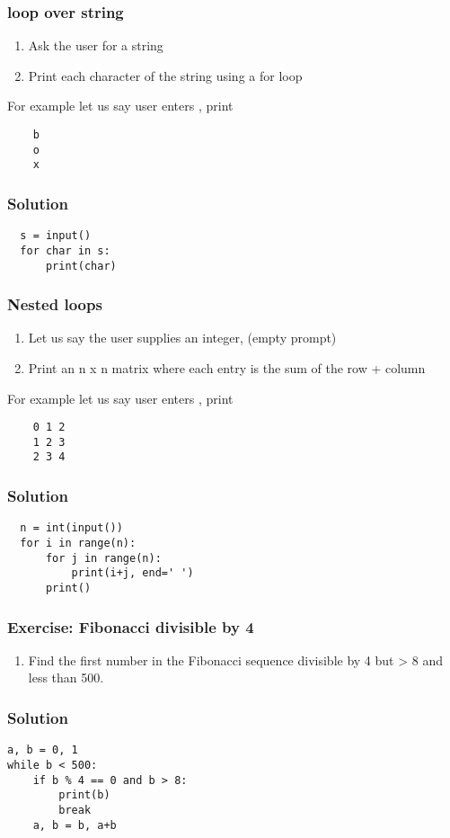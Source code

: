 \documentclass[14pt,compress]{beamer}
\begin{document}
\begin{frame}
  \frametitle{ loop over string}
  \begin{enumerate}
  \item Ask the user for a string
  \item Print each character of the string using a for loop
  \end{enumerate}
  For example let us say user enters , print
  \begin{lstlisting}
    b
    o
    x
  \end{lstlisting}
\end{frame}

\begin{frame}
\frametitle{Solution}
\begin{lstlisting}
  s = input()
  for char in s:
      print(char)
\end{lstlisting}
\end{frame}

\begin{frame}
  \frametitle{Nested  loops}
  \begin{enumerate}
  \item Let us say the user supplies an integer,  (empty prompt)
  \item Print an n x n matrix where each entry is the sum of the row + column
  \end{enumerate}
  For example let us say user enters , print
  \begin{lstlisting}
    0 1 2
    1 2 3
    2 3 4
  \end{lstlisting}
\end{frame}

\begin{frame}
\frametitle{Solution}
\begin{lstlisting}
  n = int(input())
  for i in range(n):
      for j in range(n):
          print(i+j, end=' ')
      print()
\end{lstlisting}
\end{frame}


\begin{frame}
  \frametitle{Exercise: Fibonacci divisible by 4}
  \begin{enumerate}
  \item Find the first number in the Fibonacci sequence divisible by 4 but > 8
    and less than 500.
  \end{enumerate}
\end{frame}

\begin{frame}
\frametitle{Solution}
\begin{lstlisting}
a, b = 0, 1
while b < 500:
    if b % 4 == 0 and b > 8:
        print(b)
        break
    a, b = b, a+b
\end{lstlisting}
\end{frame}
\end{document}

